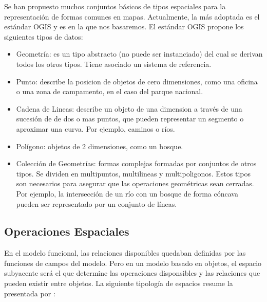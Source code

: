 Se han propuesto muchos conjuntos básicos de tipos espaciales para la representación de formas comunes en mapas.
Actualmente, la más adoptada es el estándar OGIS \cite{99opengis} y es en la que nos basaremos.
El estándar OGIS propone los siguientes tipos de datos:
\begin{itemize}
    \item Geometría: es un tipo abstracto (no puede ser instanciado) del cual se derivan todos los otros tipos.
    Tiene asociado un sistema de referencia.
    \item Punto: describe la posicion de objetos de cero dimensiones,
    como una oficina o una zona de campamento, en el caso del parque nacional.
    \item Cadena de Lineas: describe un objeto de una dimension a través de una sucesión de de dos o mas puntos,
    que pueden representar un segmento o aproximar una curva. Por ejemplo, caminos o ríos.
    \item Polígono: objetos de 2 dimensiones, como un bosque.
    \item Colección de Geometrías: formas complejas formadas por conjuntos de otros tipos.
    Se dividen en multipuntos, multilineas y multipoligonos.
    Estos tipos son necesarios para asegurar que las operaciones geométricas sean cerradas.
    Por ejemplo, la intersección de un río con un bosque de forma cóncava pueden ser representado por un conjunto de líneas.
\end{itemize}

\subsection{Operaciones Espaciales}

En el modelo funcional, las relaciones disponibles quedaban definidas por las funciones de campos del modelo.
Pero en un modelo basado en objetos, el espacio subyacente será el que determine las operaciones disponsibles
y las relaciones que pueden existir entre objetos. La siguiente tipología de espacios resume la presentada por \cite{spatial:book}:

